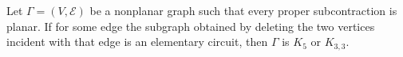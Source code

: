 Let $\Gamma = (V, \mathcal{E})$ be a nonplanar graph such that every proper subcontraction is planar. If for some edge the subgraph obtained by deleting the two vertices incident with that edge is an elementary circuit, then $\Gamma$ is $K_5$ or $K_{3,3}$.
